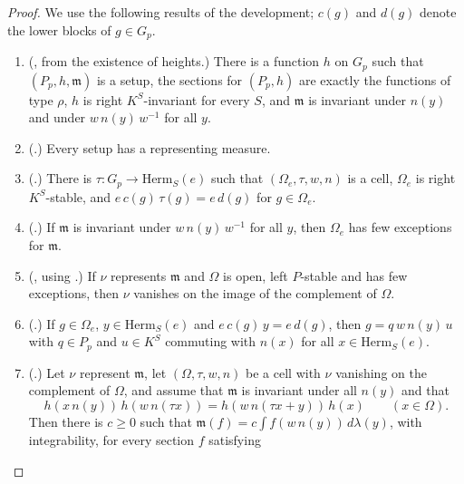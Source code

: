 \begin{proof}
We use the following results of the development; $c(g)$ and $d(g)$ denote the lower blocks of $g\in G_p$.
\begin{enumerate}[label=(C\arabic*)]
\item\label{pf:liftinj:C1} (, from the existence of heights.) There is a function $h$ on
$G_p$ such that $(P_p,h,\mathfrak m)$ is a setup, the sections for $(P_p,h)$ are exactly the functions of type $\rho$, $h$ is right $K^S$-invariant
for every $S$, and $\mathfrak m$ is invariant under $n(y)$ and under $w\,n(y)\,w^{-1}$ for all $y$.
\item\label{pf:liftinj:C2} (.) Every setup has a representing measure.
\item\label{pf:liftinj:C3} (.) There is $\tau:G_p\to\mathrm{Herm}_S(e)$ such that
$(\Omega_e,\tau,w,n)$ is a cell, $\Omega_e$ is right $K^S$-stable, and $e\,c(g)\,\tau(g)=e\,d(g)$ for $g\in\Omega_e$.
\item\label{pf:liftinj:C4} (.) If $\mathfrak m$ is invariant under $w\,n(y)\,w^{-1}$ for all $y$,
then $\Omega_e$ has few exceptions for $\mathfrak m$.
\item\label{pf:liftinj:C5} (, using
.) If $\nu$ represents $\mathfrak m$ and $\Omega$ is open, left $P$-stable and has few
exceptions, then $\nu$ vanishes on the image of the complement of $\Omega$.
\item\label{pf:liftinj:C6} (.) If $g\in\Omega_e$, $y\in\mathrm{Herm}_S(e)$ and
$e\,c(g)\,y=e\,d(g)$, then $g=q\,w\,n(y)\,u$ with $q\in P_p$ and $u\in K^S$ commuting with $n(x)$ for all $x\in\mathrm{Herm}_S(e)$.
\item\label{pf:liftinj:C7} (.) Let $\nu$ represent $\mathfrak m$, let
$(\Omega,\tau,w,n)$ be a cell with $\nu$ vanishing on the complement of $\Omega$, and assume that $\mathfrak m$ is invariant under all $n(y)$ and that
\begin{equation}\label{eq:pf:liftinj:cocycle}
h(x\,n(y))\,h(w\,n(\tau x))=h(w\,n(\tau x+y))\,h(x)\qquad(x\in\Omega).
\end{equation}
Then there is $c\ge0$ such that $\mathfrak m(f)=c\int f(w\,n(y))\,d\lambda(y)$, with integrability, for every section $f$ satisfying

\end{enumerate}
\end{proof}
